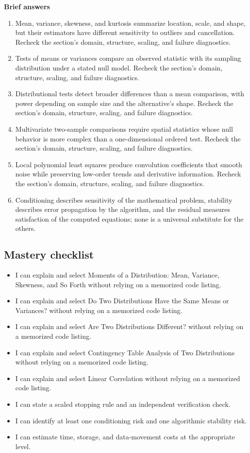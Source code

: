 \documentclass[10pt,letterpaper]{article}
\begin{document}
\textbf{Brief answers}
\begin{enumerate}
\item Mean, variance, skewness, and kurtosis summarize location, scale, and shape, but their estimators have different sensitivity to outliers and cancellation. Recheck the section's domain, structure, scaling, and failure diagnostics.
\item Tests of means or variances compare an observed statistic with its sampling distribution under a stated null model. Recheck the section's domain, structure, scaling, and failure diagnostics.
\item Distributional tests detect broader differences than a mean comparison, with power depending on sample size and the alternative's shape. Recheck the section's domain, structure, scaling, and failure diagnostics.
\item Multivariate two-sample comparisons require spatial statistics whose null behavior is more complex than a one-dimensional ordered test. Recheck the section's domain, structure, scaling, and failure diagnostics.
\item Local polynomial least squares produce convolution coefficients that smooth noise while preserving low-order trends and derivative information. Recheck the section's domain, structure, scaling, and failure diagnostics.
\item Conditioning describes sensitivity of the mathematical problem, stability describes error propagation by the algorithm, and the residual measures satisfaction of the computed equations; none is a universal substitute for the others.
\end{enumerate}

\subsection*{Mastery checklist}
\begin{itemize}
\item[$\square$] I can explain and select Moments of a Distribution: Mean, Variance, Skewness, and So Forth without relying on a memorized code listing.
\item[$\square$] I can explain and select Do Two Distributions Have the Same Means or Variances? without relying on a memorized code listing.
\item[$\square$] I can explain and select Are Two Distributions Different? without relying on a memorized code listing.
\item[$\square$] I can explain and select Contingency Table Analysis of Two Distributions without relying on a memorized code listing.
\item[$\square$] I can explain and select Linear Correlation without relying on a memorized code listing.
\item[$\square$] I can state a scaled stopping rule and an independent verification check.
\item[$\square$] I can identify at least one conditioning risk and one algorithmic stability risk.
\item[$\square$] I can estimate time, storage, and data-movement costs at the appropriate level.
\end{itemize}
\end{document}
